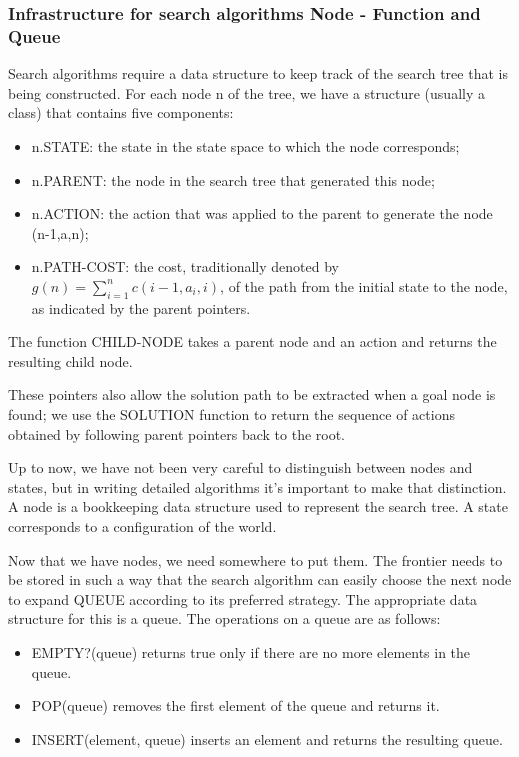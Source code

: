 \subsubsection{Infrastructure for search algorithms Node - Function and Queue}
Search algorithms require a data structure to keep track of the search tree that is being constructed.
For each node n of the tree, we have a structure (usually a class) that contains five components:
\begin{itemize}
  \item n.STATE: the state in the state space to which the node corresponds;
  \item n.PARENT: the node in the search tree that generated this node;
  \item n.ACTION: the action that was applied to the parent to generate the node (n-1,a,n);
  \item n.PATH-COST: the cost, traditionally denoted by $g(n)= \sum_{i=1}^{n} c(i-1, a_{i}, i)$, of the path from the initial state to the node, as indicated by the parent pointers.
\end{itemize}
The function CHILD-NODE takes a parent node and an action
and returns the resulting child node.

These pointers also allow the solution path to be
extracted when a goal node is found; we use the SOLUTION function to return the sequence of actions obtained by following parent pointers back to the root.

Up to now, we have not been very careful to distinguish between nodes and states, but in writing detailed algorithms it’s important to make that distinction. A node is a bookkeeping data structure used to represent the search tree. A state corresponds to a configuration of the world.

Now that we have nodes, we need somewhere to put them. The frontier needs to be stored in such a way that the search algorithm can easily choose the next node to expand QUEUE according to its preferred strategy. The appropriate data structure for this is a queue. The operations on a queue are as follows:
\begin{itemize}
  \item EMPTY?(queue) returns true only if there are no more elements in the queue.
  \item POP(queue) removes the first element of the queue and returns it.
  \item INSERT(element, queue) inserts an element and returns the resulting queue.
\end{itemize}

